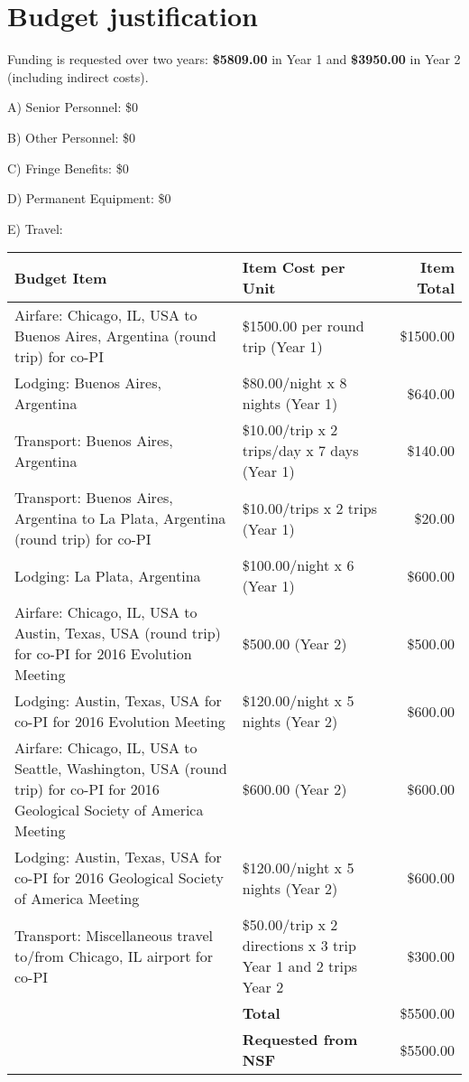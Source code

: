\documentclass[11pt,letterpaper]{article}
\begin{document}
\setcounter{secnumdepth}{0}
\section{Budget justification}

Funding is requested over two years: \textbf{\$5809.00} in Year 1 and \textbf{\$3950.00} in Year 2 (including indirect costs).

A) Senior Personnel: \$0

B) Other Personnel: \$0

C) Fringe Benefits: \$0

D) Permanent Equipment: \$0

E) Travel:

\begin{tabular}[H]{p{7.5cm} | p{4.5cm} | r}
  Budget Item & Item Cost per Unit & Item Total \\
  \hline
  Airfare: Chicago, IL, USA to Buenos Aires, Argentina (round trip) for co-PI & \$1500.00 per round trip (Year 1) & \$1500.00 \\
  \hline
  Lodging: Buenos Aires, Argentina & \$80.00/night x 8 nights (Year 1) & \$640.00 \\
  \hline
  Transport: Buenos Aires, Argentina & \$10.00/trip x 2 trips/day x 7 days (Year 1) & \$140.00 \\
  \hline
  Transport: Buenos Aires, Argentina to La Plata, Argentina (round trip) for co-PI & \$10.00/trips x 2 trips (Year 1) & \$20.00 \\
  \hline
  Lodging: La Plata, Argentina & \$100.00/night x 6 (Year 1) & \$600.00 \\
  \hline
  Airfare: Chicago, IL, USA to Austin, Texas, USA (round trip) for co-PI for 2016 Evolution Meeting & \$500.00 (Year 2) & \$500.00 \\
  \hline
  Lodging: Austin, Texas, USA for co-PI for 2016 Evolution Meeting & \$120.00/night x 5 nights (Year 2) & \$600.00 \\
  \hline
  Airfare: Chicago, IL, USA to Seattle, Washington, USA (round trip) for co-PI for 2016 Geological Society of America Meeting & \$600.00 (Year 2) & \$600.00 \\
  \hline
  Lodging: Austin, Texas, USA for co-PI for 2016 Geological Society of America Meeting & \$120.00/night x 5 nights (Year 2) & \$600.00 \\
  \hline
  Transport: Miscellaneous travel to/from Chicago, IL airport for co-PI & \$50.00/trip x 2 directions x 3 trip Year 1 and 2 trips Year 2 & \$300.00 \\
  \hline
  & \textbf{Total} & \$5500.00 \\
  & \textbf{Requested from NSF} & \$5500.00
\end{tabular}
\end{document}
